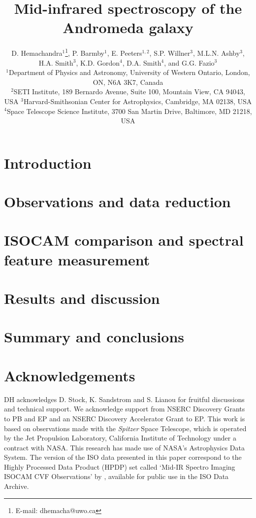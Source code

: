 \documentclass[useAMS,usenatbib,a4paper]{mn2e}
\title[Mid-infrared spectroscopy of M31]{Mid-infrared spectroscopy of the Andromeda galaxy}
\author[D. Hemachandra et al.]
{D. Hemachandra$^{1}$\thanks{E-mail: dhemacha@uwo.ca},
P. Barmby$^{1}$, 
E. Peeters$^{1,2}$, 
S.P. Willner$^{3}$, 
M.L.N. Ashby$^{3}$,
H.A. Smith$^{3}$, 
\newauthor 
K.D. Gordon$^{4}$,
D.A. Smith$^{4}$,
and
G.G. Fazio$^{3}$\\
$^{1}$Department of Physics and Astronomy, University of Western Ontario, London, ON, N6A 3K7, Canada\\
$^{2}$SETI Institute, 189 Bernardo Avenue, Suite 100, Mountain View, CA 94043, USA
$^{3}$Harvard-Smithsonian Center for Astrophysics, Cambridge, MA 02138, USA\\
$^{4}$Space Telescope Science Institute, 3700 San Martin Drive, Baltimore, MD 21218, USA
}
\begin{document}
\date{}

\maketitle

\label{firstpage}



\section{Introduction}



\section{Observations and data reduction}



\section{ISOCAM comparison and spectral feature measurement}
\label{sect:data_analysis}



\section{Results and discussion}



\section{Summary and conclusions}



\section*{Acknowledgements}


DH acknowledges D. Stock, K. Sandstrom and S. Lianou for fruitful discussions and technical support. 
We acknowledge support from NSERC Discovery Grants to PB and EP and an NSERC Discovery Accelerator Grant to EP. 
This work is based on observations made with the {\em Spitzer} Space Telescope, which is operated by the 
Jet Propulsion Laboratory, California Institute of Technology under a contract with NASA.
This research has made use of NASA's Astrophysics Data System.
The version of the ISO data presented in this paper correspond to the Highly Processed Data Product (HPDP) set called `Mid-IR Spectro Imaging ISOCAM CVF Observations'
by \citet{Boulanger_F_2005}, available for public use in the ISO Data Archive.



{}

\bsp

\label{lastpage}
\end{document}
